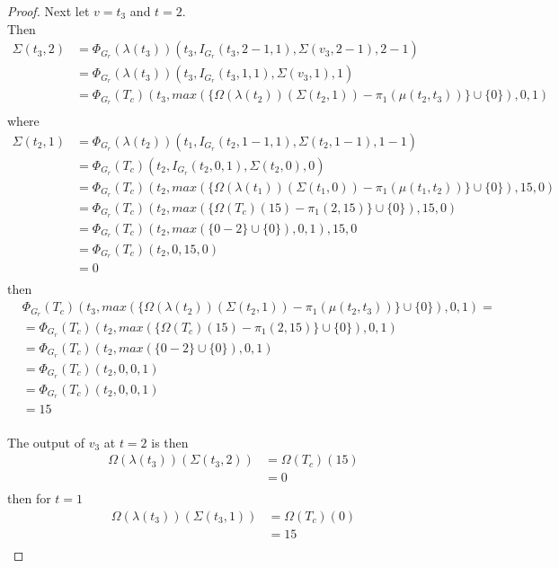 \documentclass{article}
\begin{document}
\begin{proof}
	Next let \(v = t_{3}\) and \(t = 2\). \\
	Then 
	\begin{align*}
		\Sigma(t_{3}, 2) &= \Phi_{G_{r}}(\lambda(t_{3}))(t_{3}, I_{G_{r}}(t_{3}, 2 - 1, 1), \Sigma(v_{3}, 2 - 1), 2 - 1)\\
						 &= \Phi_{G_{r}}(\lambda(t_{3}))(t_{3}, I_{G_{r}}(t_{3}, 1, 1), \Sigma(v_{3}, 1), 1) \\
						 &= \Phi_{G_{r}}(T_{c})(t_{3}, max(\{\Omega(\lambda(t_{2}))(\Sigma(t_{2}, 1)) - \pi_{1}(\mu(t_{2}, t_{3}))\} \cup \{0\}), 0, 1) \\
	\end{align*}
	where 
	\begin{align*}
		\Sigma(t_{2}, 1) &= \Phi_{G_{r}}(\lambda(t_{2}))(t_{1}, I_{G_{r}}(t_{2}, 1 - 1, 1), \Sigma(t_{2}, 1 - 1), 1 - 1) \\ 
						 &= \Phi_{G_{r}}(T_{c})(t_{2}, I_{G_{r}}(t_{2}, 0, 1), \Sigma(t_{2}, 0), 0) \\
						 &= \Phi_{G_{r}}(T_{c})(t_{2}, max(\{\Omega(\lambda(t_{1}))(\Sigma(t_{1}, 0)) - \pi_{1}(\mu(t_{1}, t_{2}))\} \cup \{0\}), 15, 0) \\
						 &= \Phi_{G_{r}}(T_{c})(t_{2}, max(\{\Omega(T_{c})(15) - \pi_{1}(2, 15)\} \cup \{0\}), 15, 0) \\
						 &= \Phi_{G_{r}}(T_{c})(t_{2}, max(\{0 - 2\} \cup \{0\}), 0, 1), 15, 0\\
						 &= \Phi_{G_{r}}(T_{c})(t_{2}, 0, 15, 0) \\
						 &= 0 \\
	\end{align*}
	then 
	\begin{align*}
		&\Phi_{G_{r}}(T_{c})(t_{3}, max(\{\Omega(\lambda(t_{2}))(\Sigma(t_{2}, 1)) - \pi_{1}(\mu(t_{2}, t_{3}))\} \cup \{0\}), 0, 1) = \\
																		   &= \Phi_{G_{r}}(T_{c})(t_{2}, max(\{\Omega(T_{c})(15) - \pi_{1}(2, 15)\} \cup \{0\}), 0, 1)\\
																		   &= \Phi_{G_{r}}(T_{c})(t_{2}, max(\{0 - 2\} \cup \{0\}), 0, 1)\\
																		   &= \Phi_{G_{r}}(T_{c})(t_{2}, 0, 0, 1)\\
																		   &= \Phi_{G_{r}}(T_{c})(t_{2}, 0, 0, 1)\\
																		   &= 15\\
	\end{align*}

	The output of \(v_{3}\) at \(t = 2\) is then 
	\begin{align*}
		\Omega(\lambda(t_{3}))(\Sigma(t_{3}, 2)) &= \Omega(T_{c})(15) \\
		& = 0 \\ 
	\end{align*}
	then for \(t = 1\)
	\begin{align*}
		\Omega(\lambda(t_{3}))(\Sigma(t_{3}, 1)) &= \Omega(T_{c})(0) \\
		& = 15 \\ 
	\end{align*}


\end{proof}
\end{document}
